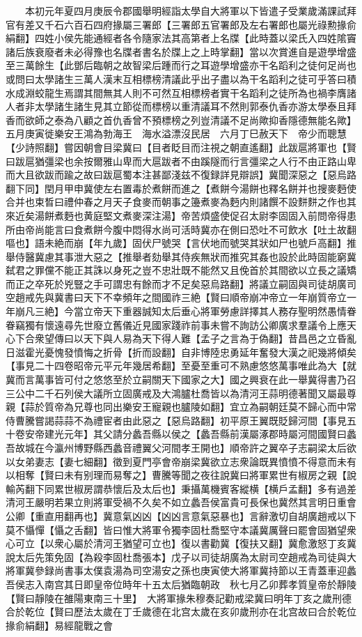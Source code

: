 　　本初元年夏四月庚辰令郡國舉明經詣太學自大將軍以下皆遣子受業歲滿課試拜官有差又千石六百石四府掾屬三署郎【三署郎五官署郎及左右署郎也屬光祿勲掾俞絹翻】四姓小侯先能通經者各令隨家法其高第者上名牒【此時蓋以梁氏入四姓隂竇諸后族衰廢者未必得豫也名牒者書名於牒上之上時掌翻】當以次賞進自是遊學增盛至三萬餘生【此鄧后臨朝之故智梁后踵而行之耳遊學增盛亦干名蹈利之徒何足尚也　或問曰太學諸生三萬人漢末互相標榜清議此乎出子盡以為干名蹈利之徒可乎答曰積水成淵蛟龍生焉謂其間無其人則不可然互相標榜者實干名蹈利之徒所為也禍李膺諸人者非太學諸生諸生見其立節從而標榜以重清議耳不然則郭泰仇香亦游太學泰且拜香而欲師之泰為八顧之首仇香曾不預標榜之列豈清議不足尚歟抑香隱德無能名歟】　五月庚寅徙樂安王鴻為勃海王　海水溢漂沒民居　六月丁巳赦天下　帝少而聰慧【少詩照翻】嘗因朝會目梁冀曰【目者眨目而注視之朝直遙翻】此跋扈將軍也【賢曰跋扈猶彊梁也余按爾雅山卑而大扈跋者不由蹊隧而行言彊梁之人行不由正路山卑而大且欲跋而踰之故曰跋扈蜀本注甚鄙淺兹不復録詳見辯誤】冀聞深惡之【惡烏路翻下同】閏月甲申冀使左右置毒於煮餅而進之【煮餅今湯餅也釋名餅并也搜麥麪使合并也束晳曰禮仲春之月天子食麥而朝事之籩煮麥為麪内則諸饌不設䴵䴵之作也其來近矣湯餅煮麪也黄庭堅文煮麥深注湯】帝苦煩盛使促召太尉李固固入前問帝得患所由帝尚能言曰食煮餅今腹中悶得水尚可活時冀亦在側曰恐吐不可飲水【吐土故翻嘔也】語未絶而崩【年九歲】固伏尸號哭【言伏地而號哭其狀如尸也號戶高翻】推舉侍醫冀慮其事泄大惡之【推舉者劾舉其侍疾無狀而推究其姦也設於此時固能窮冀弑君之罪儻不能正其誅以身死之豈不忠壯既不能然又且俛首於其間欲以立長之議矯而正之卒死於兇豎之手可謂忠有餘而才不足矣惡烏路翻】將議立嗣固與司徒胡廣司空趙戒先與冀書曰天下不幸頻年之間國祚三絶【賢曰順帝崩冲帝立一年崩質帝立一年崩凡三絶】今當立帝天下重器誠知太后垂心將軍勞慮詳擇其人務存聖明然愚情眷眷竊獨有懷遠尋先世廢立舊儀近見國家踐祚前事未嘗不詢訪公卿廣求羣議令上應天心下合衆望傳曰以天下與人易為天下得人難【孟子之言為于偽翻】昔昌邑之立昏亂日滋霍光憂愧發憤悔之折骨【折而設翻】自非博陸忠勇延年奮發大漢之祀幾將傾矣【事見二十四卷昭帝元平元年幾居希翻】至憂至重可不熟慮悠悠萬事唯此為大【就冀而言萬事皆可付之悠悠至於立嗣關天下國家之大】國之興衰在此一舉冀得書乃召三公中二千石列侯大議所立固廣戒及大鴻臚杜喬皆以為清河王蒜明德著聞又屬最尊親【蒜於質帝為兄尊也同出樂安王寵親也臚陵如翻】宜立為嗣朝廷莫不歸心而中常侍曹騰嘗謁蒜蒜不為禮宦者由此惡之【惡烏路翻】初平原王翼既貶歸河間【事見五十卷安帝建光元年】其父請分蠡吾縣以侯之【蠡吾縣前漢屬涿郡時屬河間國賢曰蠡吾故城在今瀛州博野縣西蠡音禮翼父河間孝王開也】順帝許之翼卒子志嗣梁太后欲以女弟妻志【妻七細翻】徵到夏門亭會帝崩梁冀欲立志衆論既異憤憤不得意而未有以相奪【賢曰未有别理而易奪之】曹騰等聞之夜往說冀曰將軍累世有椒房之親【說輸芮翻下同累世椒房謂恭懷后及太后也】秉攝萬機賓客縱横【横戶孟翻】多有過差清河王嚴明若果立則將軍受禍不久矣不如立蠡吾侯富貴可長保也冀然其言明日重會公卿【重直用翻再也】冀意氣凶凶【凶凶言意氣惡暴也】言辭激切自胡廣趙戒以下莫不懾憚【懾之舌翻】皆曰惟大將軍令獨李固杜喬堅守本議冀厲聲曰罷會固猶望衆心可立【以衆心屬於清河王猶望可立也】復以書勸冀【復扶又翻】冀愈激怒丁亥冀說太后先策免固【為殺李固杜喬張本】戊子以司徒胡廣為太尉司空趙戒為司徒與大將軍冀參録尚書事太僕袁湯為司空湯安之孫也庚寅使大將軍冀持節以王青蓋車迎蠡吾侯志入南宫其日即皇帝位時年十五太后猶臨朝政　秋七月乙卯葬孝質皇帝於靜陵【賢曰靜陵在雒陽東南三十里】　大將軍掾朱穆奏記勸戒梁冀曰明年丁亥之歲刑德合於乾位【賢曰歷法太歲在丁壬歲德在北宫太歲在亥卯歲刑亦在北宫故曰合於乾位掾俞絹翻】易經龍戰之會